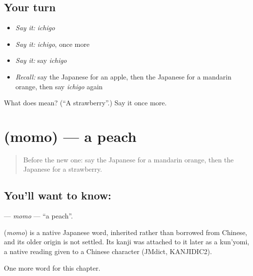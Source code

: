 \subsection*{Your turn}
\begin{itemize}
\raggedright
  \item \emph{Say it:} \emph{ichigo}
  \item \emph{Say it:} \emph{ichigo}, once more
  \item \emph{Say it:} say \emph{ichigo}
  \item \emph{Recall:} say the Japanese for an apple, then the Japanese for a mandarin orange, then say \emph{ichigo} again
\end{itemize}

\begin{tcolorbox}[breakable,colback=teal!4,colframe=teal!35!black,title={Before you move on}]
What does  mean? (\textquotedblleft{}A strawberry\textquotedblright{}.) Say it once more.
\end{tcolorbox}
\section[\texorpdfstring{\ja{もも} (momo)}{もも (momo)}]{ (momo) — a peach}

\label{lesson:JA-C33-momo}



\begin{quote}
Before the new one: say the Japanese for a mandarin orange, then the Japanese for a strawberry.
\end{quote}

\subsection*{You'll want to know: }
\textbf{} — \emph{momo} — \textquotedblleft{}a peach\textquotedblright{}.

\begin{cousinweb}
\textbf{} (\emph{momo}) is a native Japanese word, inherited rather than borrowed from Chinese, and its older origin is not settled. Its kanji was attached to it later as a kun'yomi, a native reading given to a Chinese character (JMdict, KANJIDIC2).
\end{cousinweb}

\begin{grammarlens}[title={What you've built}]
One more word for this chapter.
\end{grammarlens}

